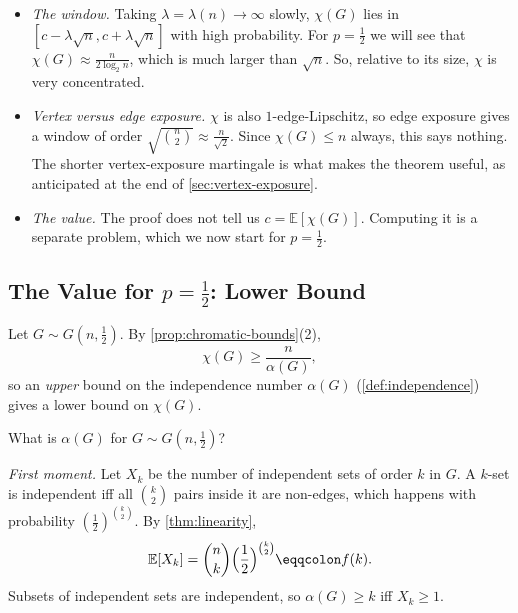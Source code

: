 \begin{remark}\label{rmk:shamir-spencer}
    \begin{itemize}
        \item \emph{The window.} Taking \(\lambda = \lambda(n) \to \infty\) slowly, \(\chi(G)\) lies in \([c - \lambda\sqrt{n}, c + \lambda\sqrt{n}]\) with high probability. For \(p = \frac{1}{2}\) we will see that \(\chi(G) \approx \frac{n}{2\log_{2} n}\), which is much larger than \(\sqrt{n}\). So, relative to its size, \(\chi\) is very concentrated.
        \item \emph{Vertex versus edge exposure.} \(\chi\) is also \(1\)-edge-Lipschitz, so edge exposure gives a window of order \(\sqrt{\binom{n}{2}} \approx \frac{n}{\sqrt{2}}\). Since \(\chi(G) \le n\) always, this says nothing. The shorter vertex-exposure martingale is what makes the theorem useful, as anticipated at the end of \autoref{sec:vertex-exposure}.
        \item \emph{The value.} The proof does not tell us \(c = \mathbb{E}[\chi(G)]\). Computing it is a separate problem, which we now start for \(p = \frac{1}{2}\).
    \end{itemize}
\end{remark}

\subsection{The Value for \texorpdfstring{\(p = \frac{1}{2}\)}{p = 1/2}: Lower Bound}\label{sec:chi-lower}

Let \(G \sim G(n, \frac{1}{2})\). By \autoref{prop:chromatic-bounds}(2),
\[
    \chi(G) \ge \frac{n}{\alpha(G)} ,
\]
so an \emph{upper} bound on the independence number \(\alpha(G)\) (\autoref{def:independence}) gives a lower bound on \(\chi(G)\).

\begin{question}\label{q:alpha-gnp}
    What is \(\alpha(G)\) for \(G \sim G(n, \frac{1}{2})\)?
\end{question}

\emph{First moment.} Let \(X_{k}\) be the number of independent sets of order \(k\) in \(G\). A \(k\)-set is independent iff all \(\binom{k}{2}\) pairs inside it are non-edges, which happens with probability \((\frac{1}{2})^{\binom{k}{2}}\). By \autoref{thm:linearity},
\[
    \mathbb{E}[X_{k}] = \binom{n}{k} \Bigl( \frac{1}{2} \Bigr)^{\binom{k}{2}} \eqqcolon f(k) .
\]
Subsets of independent sets are independent, so \(\alpha(G) \ge k\) iff \(X_{k} \ge 1\).

